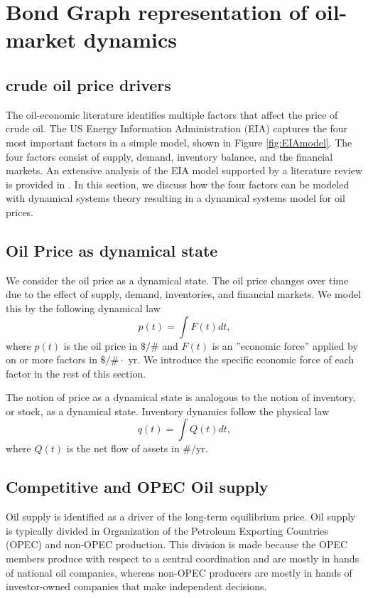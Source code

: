 \section{Bond Graph representation of oil-market dynamics}
\label{sec: EconEng}

\subsection{crude oil price drivers}
The oil-economic literature identifies multiple factors that affect the price of crude oil.
The US Energy Information Administration (EIA) captures the four most important factors in a simple model, shown in Figure \ref{fig:EIAmodel}.
The four factors consist of supply, demand, inventory balance, and the financial markets.
An extensive analysis of the EIA model supported by a literature review is provided in \cite{Lang2020}.
In this section, we discuss how the four factors can be modeled with dynamical systems theory resulting in a dynamical systems model for oil prices.




\subsection{Oil Price as dynamical state}
We consider the oil price as a dynamical state.
The oil price changes over time due to the effect of supply, demand, inventories, and financial markets.
We model this by the following dynamical law
\begin{equation}
\label{eq: pdot}
    {p}(t) = \int F(t) dt,
\end{equation}
where $p(t)$ is  the oil price in $\$/\#$ and $F(t)$ is an ''economic force'' applied by on or more factors in $\$/\#\cdot$ yr.
We introduce the specific economic force of each factor in the rest of this section.

The notion of price as a dynamical state is analogous to the notion of inventory, or stock, as a dynamical state.
Inventory dynamics follow the physical law
\begin{equation}
    \label{eq: qdot}
 q(t) = \int Q (t) dt,
\end{equation}
where $Q(t)$ is the net flow of assets in $\#/$yr.


\subsection{Competitive and OPEC Oil supply}
Oil supply is identified as a driver of the long-term equilibrium price.
Oil supply is typically divided in Organization of the Petroleum Exporting Countries (OPEC) and non-OPEC production.
This division is made because the OPEC members produce with respect to a central coordination and are mostly in hands of national oil companies, whereas non-OPEC producers are mostly in hands of investor-owned companies that make independent decisions.

